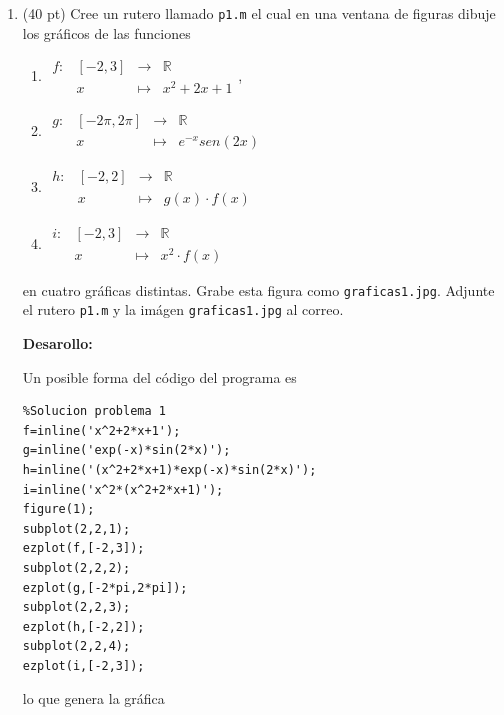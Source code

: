 \documentclass[11pt]{article}
\begin{document}
\begin{enumerate}
\item (40 pt) Cree un rutero llamado \texttt{p1.m} el cual en una ventana de figuras dibuje los gr\'aficos de las funciones
\begin{multicols}{2} 
\begin{enumerate}
\item 
$\begin{array}{cccc}
f: & [-2,3] & \longrightarrow & \mathbb{R}\\
	& x 	& \longmapsto 	& x^2+2x+1
\end{array}$,
\item 
$\begin{array}{cccc}
g: & [-2\pi,2\pi] & \longrightarrow & \mathbb{R}\\
	& x 	& \longmapsto 	& e^{-x}sen(2x)
\end{array}$
\item
$\begin{array}{cccc}
h: & [-2,2] & \longrightarrow & \mathbb{R}\\
	& x 	& \longmapsto 	& g(x)\cdot f(x)
\end{array}$
\item
$\begin{array}{cccc}
i: & [-2,3] & \longrightarrow & \mathbb{R}\\
	& x 	& \longmapsto 	& x^2\cdot f(x)
\end{array}$    
\end{enumerate}
\end{multicols}

en cuatro gr\'aficas distintas. Grabe esta figura como \texttt{graficas1.jpg}. Adjunte el rutero \texttt{p1.m} y la im\'agen \texttt{graficas1.jpg} al correo.

\textbf{Desarollo:} 

Un posible forma del código del programa es
\begin{lstlisting}
%Solucion problema 1
f=inline('x^2+2*x+1');
g=inline('exp(-x)*sin(2*x)');
h=inline('(x^2+2*x+1)*exp(-x)*sin(2*x)');
i=inline('x^2*(x^2+2*x+1)');
figure(1);
subplot(2,2,1);
ezplot(f,[-2,3]);
subplot(2,2,2);
ezplot(g,[-2*pi,2*pi]);
subplot(2,2,3);
ezplot(h,[-2,2]);
subplot(2,2,4);
ezplot(i,[-2,3]);
\end{lstlisting}
\fbox{30 pt}
lo que genera la gr\'afica


\end{enumerate}
\end{document}
